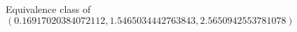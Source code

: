 \documentclass[preview]{standalone}
\begin{document}
\begin{center}
Equivalence class of $(0.16917020384072112, 1.5465034442763843, 2.5650942553781078)$
\end{center}
\end{document}

